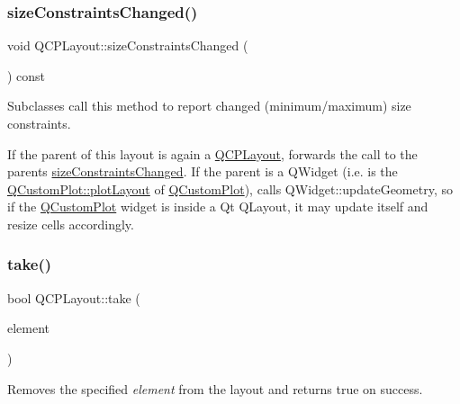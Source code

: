 \mbox{\label{class_q_c_p_layout_aeac66a292f65cf7f8adf94eb92345b3e}} 
\subsubsection{\texorpdfstring{size\+Constraints\+Changed()}{sizeConstraintsChanged()}}
{\footnotesize\ttfamily void Q\+C\+P\+Layout\+::size\+Constraints\+Changed (\begin{DoxyParamCaption}{ }\end{DoxyParamCaption}) const\hspace{0.3cm}{\ttfamily [protected]}}

Subclasses call this method to report changed (minimum/maximum) size constraints.

If the parent of this layout is again a \hyperlink{class_q_c_p_layout}{Q\+C\+P\+Layout}, forwards the call to the parent\textquotesingle{}s \hyperlink{class_q_c_p_layout_aeac66a292f65cf7f8adf94eb92345b3e}{size\+Constraints\+Changed}. If the parent is a Q\+Widget (i.\+e. is the \hyperlink{class_q_custom_plot_af1a1f1f571237deb7c2bd34a5e9f018f}{Q\+Custom\+Plot\+::plot\+Layout} of \hyperlink{class_q_custom_plot}{Q\+Custom\+Plot}), calls Q\+Widget\+::update\+Geometry, so if the \hyperlink{class_q_custom_plot}{Q\+Custom\+Plot} widget is inside a Qt Q\+Layout, it may update itself and resize cells accordingly. \mbox{\label{class_q_c_p_layout_ada26cd17e56472b0b4d7fbbc96873e4c}} 
\subsubsection{\texorpdfstring{take()}{take()}}
{\footnotesize\ttfamily bool Q\+C\+P\+Layout\+::take (\begin{DoxyParamCaption}\item[{\hyperlink{class_q_c_p_layout_element}{Q\+C\+P\+Layout\+Element} $\ast$}]{element }\end{DoxyParamCaption})\hspace{0.3cm}{\ttfamily [pure virtual]}}

Removes the specified {\itshape element} from the layout and returns true on success.

